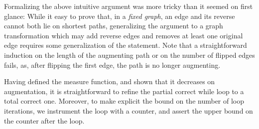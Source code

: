 \documentclass{llncs}
\begin{document}
  Formalizing the above intuitive argument was more tricky than it seemed on first glance:
  While it easy to prove that, in a \emph{fixed graph}, an edge and its reverse cannot both lie on shortest paths, generalizing the argument
  to a graph transformation which may add reverse edges and removes at least one original edge requires some generalization of the statement.
  Note that a straightforward induction on the length of the augmenting path or on the number of flipped edges fails, as, after flipping the first 
  edge, the path is no longer augmenting.
  
%   
%   
%   
  
  Having defined the measure function, and shown that it decreases on augmentation, it is straightforward to refine the partial correct while loop to a total correct one. Moreover, to make explicit the bound on the number of loop iterations, we instrument the loop with a counter, and assert the upper bound on the counter after the loop.
\end{document}
